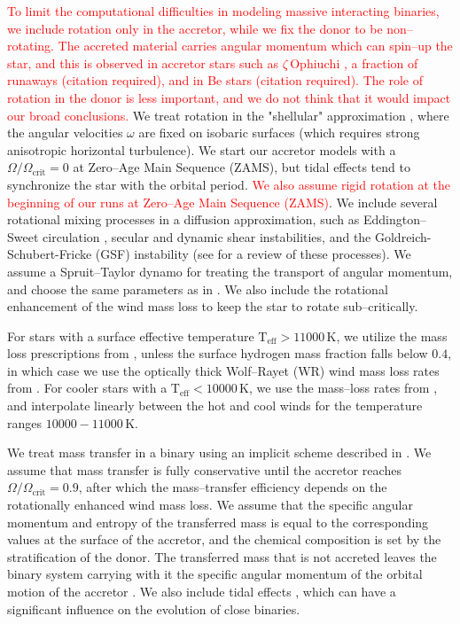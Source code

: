 \documentclass[linenumbers,trackchanges,twocolumn]{aastex701}
\newcommand{\red}{\textcolor{red}}
\begin{document}
\red{To limit the computational difficulties in modeling massive interacting binaries, we include rotation only in the accretor, while we fix the donor to be non--rotating. The accreted material carries angular momentum which can spin--up the star, and this is observed in accretor stars such as $\zeta\, \mathrm{Ophiuchi}$ \citep{2018AN....339...46Z, 2021ApJ...923..277R}, a fraction of runaways (citation required), and in Be stars (citation required). The role of rotation in the donor is less important, and we do not think that it would impact our broad conclusions.} We treat rotation in the "shellular" approximation \citep{1992A&A...265..115Z,2012A&A...537A.146E}, where the angular velocities $\omega$ are fixed on isobaric surfaces (which requires strong anisotropic horizontal turbulence). We start our accretor models with a $\Omega/\Omega_{\mathrm{crit}} = 0$ at Zero--Age Main Sequence (ZAMS), but tidal effects tend to synchronize the star with the orbital period. \red{We also assume rigid rotation at the beginning of our runs at Zero--Age Main Sequence (ZAMS)}. We include several rotational mixing processes in a diffusion approximation, such as Eddington--Sweet circulation \citep{1950MNRAS.110..548S}, secular and dynamic shear instabilities, and the Goldreich-Schubert-Fricke (GSF) instability (see \citep{2000ApJ...528..368H} for a review of these processes). We assume a Spruit--Taylor dynamo \citep{2002A&A...381..923S} for treating the transport of angular momentum, and choose the same parameters as in \citep{2000ApJ...528..368H}. We also include the rotational enhancement of the wind mass loss \citep{1998A&A...329..551L} to keep the star to rotate sub--critically.

For stars with a surface effective temperature $\mathrm{T_{eff}} > 11000\,\mathrm{K}$, we utilize the mass loss prescriptions from \citep{2023A&A...676A.109B}, unless the surface hydrogen mass fraction falls below $0.4$, in which case we use the optically thick Wolf--Rayet (WR) wind mass loss rates from \citep{2000A&A...360..227N}. For cooler stars with a $\mathrm{T_{eff}} < 10000\,\mathrm{K}$, we use the mass--loss rates from \citep{2024A&A...681A..17D}, and interpolate linearly between the hot and cool winds for the temperature ranges $10000-11000\,\mathrm{K}$.

We treat mass transfer in a binary using an implicit scheme described in \citep{1990A&A...236..385K}. We assume that mass transfer is fully conservative until the accretor reaches $\Omega/\Omega_{\mathrm{crit}} = 0.9$, after which the mass--transfer efficiency depends on the rotationally enhanced wind mass loss. We assume that the specific angular momentum and entropy of the transferred mass is equal to the corresponding values at the surface of the accretor, and the chemical composition is set by the stratification of the donor. The transferred mass that is not accreted leaves the binary system carrying with it the specific angular momentum of the orbital motion of the accretor \citep{1997A&A...327..620S,2017MNRAS.471.4256V}. We also include tidal effects \citep{1977A&A....57..383Z, 1981A&A....99..126H,2002MNRAS.329..897H}, which can have a significant influence on the evolution of close binaries.
\end{document}
